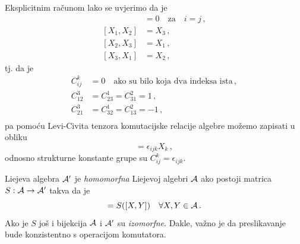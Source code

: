\begin{primjer}
Eksplicitnim računom lako se uvjerimo da je
 \begin{align}
     [X_i,X_j]& =0 \quad\text{za}\quad i=j \,,  \\
     [X_1,X_2]& = X_3 \,, \\
     [X_2,X_3]& = X_1  \,, \\
     [X_3,X_1]& = X_2 \,,
 \end{align}
tj. da je
\begin{align}
 C_{ij}^{k}& = 0 \quad\text{ako su bilo koja dva indeksa ista} \,, \\
 C_{12}^3  & = C_{23}^{1}=C_{31}^{2}=1 \,, \\
 C_{21}^3  & = C_{32}^{1}=C_{13}^{2}=-1 \,, \\
 \end{align}
pa pomoću Levi-Civita tenzora
komutacijske relacije algebre  možemo zapisati u obliku
\begin{equation}
 [X_i, X_j]=\epsilon_{ijk} X_k  \,,
  \label{eq:algebraso3}
\end{equation}
odnosno strukturne konstante grupe  su $C_{ij}^{k} = \epsilon_{ijk}$.
\end{primjer}


Liejeva algebra $\mathcal{A}'$ je \emph{homomorfna} Liejevoj algebri $\mathcal{A}$ ako postoji 
matrica $S:\mathcal{A}\to\mathcal{A}'$ takva da je
\begin{displaymath}
       [S(X), S(Y)]=S([X,Y]) \quad \forall X, Y \in\calA \,.
\end{displaymath}
Ako je $S$ još i bijekcija $\mathcal{A}$ i $\mathcal{A}'$ su \emph{izomorfne}. Dakle,
važno je da preslikavanje  bude konzistentno s operacijom komutatora.

